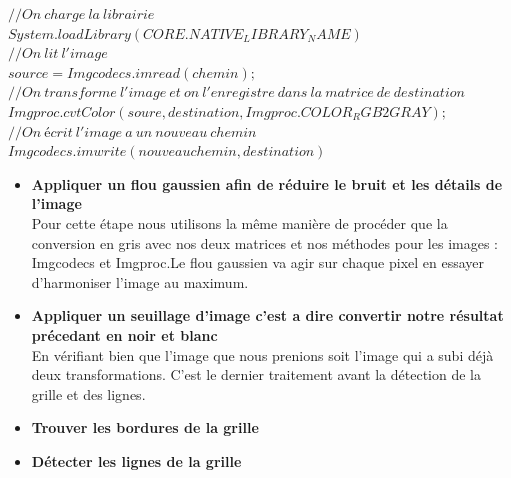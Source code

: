 \documentclass{article}
\begin{document}
    \begin{algorithm}[H]
\SetAlgoLined
{}
$//On \ charge \ la \ librairie$\\
$System.loadLibrary(CORE.NATIVE_LIBRARY_NAME)$\\

$//On \ lit \ l'image$\\
$source=Imgcodecs.imread(chemin);$\\

$//On \ transforme\ l'image \ et \ on \ l'enregistre \ dans \ la \ matrice \ de \ destination$\\

$Imgproc.cvtColor(soure,destination,Imgproc.COLOR_RGB2GRAY);$\\

$//On \ écrit \ l'image \ a \ un \ nouveau \ chemin$\\
$Imgcodecs.imwrite(nouveau chemin,destination)$\\


    \end{algorithm}
    
\begin{itemize}
        
  
    \item \textbf{Appliquer un flou gaussien afin de réduire le bruit et les détails de l'image}\\
    Pour cette étape nous utilisons la même manière de procéder que la conversion en gris avec nos deux matrices et nos méthodes pour les images : Imgcodecs et Imgproc.Le flou gaussien va agir sur chaque pixel en essayer d'harmoniser l'image au maximum.\\
    
    \item \textbf{Appliquer un seuillage d'image c'est a dire convertir notre résultat précedant en noir et blanc}
    \\
    En vérifiant bien que l'image que nous prenions soit l'image qui a subi déjà deux transformations.
    C'est le dernier traitement avant la détection de la grille et des lignes.\\
    \item \textbf{Trouver les bordures de la grille}\\
    \item \textbf{Détecter les lignes de la grille}
\end{itemize}\\
\end{document}
